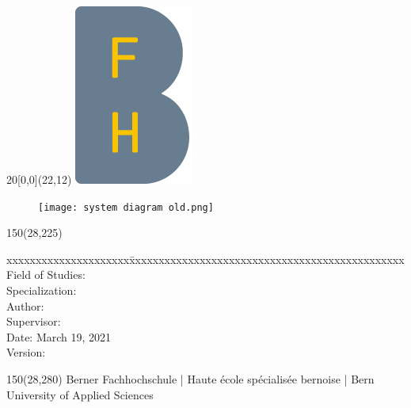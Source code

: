 
\begin{titlepage}

\setlength{\unitlength}{1mm}

\begin{textblock}{20}[0,0](22,12)
    \includegraphics{../img/BFH_Logo_B.png}
\end{textblock}

\begin{flushleft}

\vspace*{21mm}

\fontsize{24.88pt}{40pt}\selectfont
\textbf{\doctitle}
\vspace{2mm} 

\fontsize{17.28pt}{24pt}\selectfont\vspace{0.3em}
\docsubtitle
\vspace{6mm}

\begin{figure}[H]
    \texttt{[image: system diagram old.png]}
\end{figure}

\fontsize{10pt}{12pt}\selectfont
\begin{textblock}{150}(28,225)
\begin{tabbing}
xxxxxxxxxxxxxxxxxxxxx\=xxxxxxxxxxxxxxxxxxxxxxxxxxxxxxxxxxxxxxxxxxxxxxx \kill
Field of Studies:	\> \fieldofstudies	\\
Specialization:	    \> \specialisation	\\
Author:		        \> \docauthor \\
Supervisor:         \> \prof \\
Date:			    \> March 19, 2021 \\
Version:		     \\
\end{tabbing}

\end{textblock}

\begin{textblock}{150}(28,280)
\noindent 
\color{bfhgrey}\fontsize{9pt}{10pt}\selectfont
Berner Fachhochschule | Haute \'ecole sp\'ecialis\'ee bernoise | Bern University of Applied Sciences
\color{black}\selectfont
\end{textblock}

\end{flushleft}

\end{titlepage}